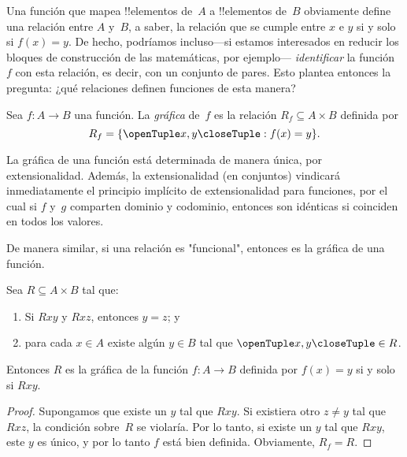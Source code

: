 \documentclass[../../../include/open-logic-section]{subfiles}
\begin{document}


\begin{explain}
Una función que mapea !!{elementos} de~$A$ a !!{elementos} de~$B$
obviamente define una relación entre $A$ y~$B$, a saber, la relación
que se cumple entre $x$ e $y$ si y solo si $f(x) = y$. De hecho, podríamos
incluso---si estamos interesados en reducir los bloques de construcción de
las matemáticas, por ejemplo--- \emph{identificar} la función~$f$ con esta
relación, es decir, con un conjunto de pares. Esto plantea entonces la pregunta:
¿qué relaciones definen funciones de esta manera?
\end{explain}

\begin{defn} Sea $f\colon A \to B$ una función.
La \emph{gráfica} de~$f$ es la relación $R_f \subseteq A \times B$
definida por
\[
R_f = \Setabs{\tuple{x,y}}{f(x) = y}.
\]
\end{defn}

\begin{explain}
La gráfica de una función está determinada de manera única, por extensionalidad.
Además, la extensionalidad (en conjuntos) vindicará inmediatamente el
principio implícito de extensionalidad para funciones,
por el cual si $f$ y~$g$ comparten dominio y codominio, entonces son
idénticas si coinciden en todos los valores.

De manera similar, si una relación es "funcional", entonces es la gráfica de una función.
\end{explain}

\begin{prop}
Sea $R \subseteq A \times B$ tal que:
\begin{enumerate}
\item Si $Rxy$ y $Rxz$, entonces $y = z$; y
\item para cada $x \in A$ existe algún $y \in B$ tal que $\tuple{x, y} \in R$.
\end{enumerate}
Entonces $R$ es la gráfica de la función $f\colon A \to B$ definida por
$f(x) = y$ si y solo si $Rxy$.
\end{prop}

\begin{proof}
Supongamos que existe un $y$ tal que $Rxy$. Si existiera otro $z \neq
y$ tal que $Rxz$, la condición sobre~$R$ se violaría. Por lo tanto, si
existe un $y$ tal que $Rxy$, este $y$ es único, y por lo tanto $f$ está
bien definida. Obviamente, $R_f = R$.
\end{proof}
\end{document}
